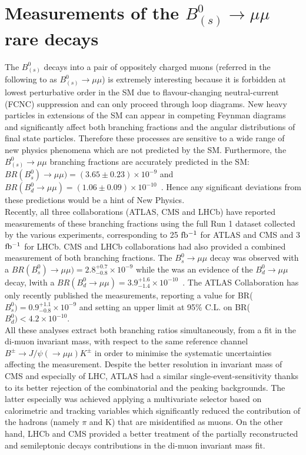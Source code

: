 \section{Measurements of the $B^0_{(s)} \to \mu\mu$ rare decays}
The $B^0_{(s)}$ decays into a pair of oppositely charged muons (referred in the following to as $B^0_{(s)} \to \mu\mu$) is extremely interesting because it is forbidden at lowest perturbative order in the SM due to flavour-changing neutral-current (FCNC) suppression and can only proceed through loop diagrams. New heavy particles in extensions of the SM can appear in competing Feynman diagrams and significantly affect both branching fractions and the angular distributions of final state particles. Therefore these processes are sensitive to a wide range of new physics phenomena which are not predicted by the SM. Furthermore, the $B^0_{(s)} \to \mu\mu$ branching fractions are accurately predicted in the SM: $BR(B^0_s) \to \mu\mu) = (3.65 \pm 0.23) \times 10^{-9}$ and $BR(B^0_d \to \mu\mu) = (1.06 \pm 0.09) \times 10^{-10}$~\cite{Bobeth}. Hence any significant deviations from these predictions would be a hint of New Physics.\\
Recently, all three collaborations (ATLAS,  CMS and LHCb) have reported measurements of these branching fractions using the full Run 1 dataset collected by the various experiments, corresponding to 25 $\rm{fb^{-1}}$ for ATLAS and CMS and 3 $\rm{fb^{-1}}$ for LHCb. CMS and LHCb collaborations had also provided a combined measurement of both branching fractions. The $B^0_s \to \mu\mu$ decay was observed with a $BR(B^0_s) \to \mu\mu) = 2.8^{+0.7}_{-0.8} \times 10^{-9}$ while the was an evidence of the  $B^0_d \to \mu\mu$ decay, lwith a  $BR(B^0_d \to \mu\mu) = 3.9^{+1.6}_{-1.4} \times 10^{-10}$~\cite{Nature}.
The ATLAS Collaboration has only recently published the measurements, reporting a value for BR($B^0_s) = 0.9^{+1.1}_{-0.8}\times 10^{-9}$ and setting an upper limit at 95\% C.L. on  BR($B^0_d) < 4.2 \times 10^{-10}$.~\cite{ATLAS}\\
All these analyses extract both branching ratios simultaneously, from a fit in the di-muon invariant mass, with respect to the same reference channel $B^{\pm} \to J/\psi(\to \mu \mu) K^{\pm}$ in order to minimise the systematic uncertainties affecting the measurement. Despite the better resolution in invariant mass of CMS and especially of LHC, ATLAS had a similar single-event-sensitivity thanks to its better rejection of the combinatorial and the peaking backgrounds. The latter especially was achieved applying a  multivariate selector based on calorimetric and tracking variables which significantly reduced the contribution of the hadrons (namely $\pi$ and K) that are misidentified as muons. On the other hand, LHCb and CMS provided a better treatment of the partially reconstructed and semileptonic decays contributions in the di-muon invariant mass fit.
